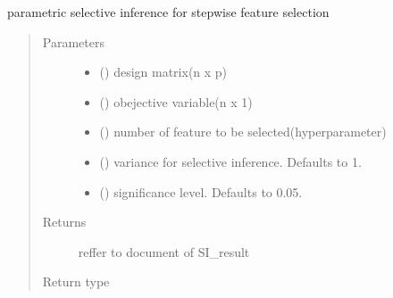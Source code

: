 \documentclass[letterpaper,10pt,english]{sphinxmanual}
\begin{document}
\begin{fulllineitems}
\label{\detokenize{selective:selective_inference.sfs_si.parametric_sfs_si}}
parametric selective inference for stepwise feature selection
\begin{quote}\begin{description}
\item[{Parameters}] \leavevmode\begin{itemize}
\item {} 
 () \textendash{} design matrix(n x p)

\item {} 
 () \textendash{} obejective variable(n x 1)

\item {} 
 () \textendash{} number of feature to be selected(hyperparameter)

\item {} 
 (\sphinxstyleliteralemphasis{\sphinxupquote{, }}) \textendash{} variance for selective inference. Defaults to 1.

\item {} 
 (\sphinxstyleliteralemphasis{\sphinxupquote{, }}) \textendash{} significance level. Defaults to 0.05.

\end{itemize}

\item[{Returns}] \leavevmode
reffer to document of SI\_result

\item[{Return type}] \leavevmode
{\hyperref[\detokenize{selective:selective_inference.si.SI_result}]{}}

\end{description}\end{quote}

\end{fulllineitems}
\end{document}

